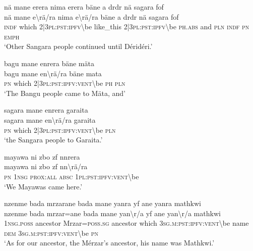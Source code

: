 \ea\label{ex:1:a3644}
nä mane erera nima erera bäne a drdr nä sagara fof\\
\gll nä	mane	e{\textbackslash}rä/ra	nima	e{\textbackslash}rä/ra	bäne	a	drdr	nä	sagara	fof\\
     \textsc{indf}	which	2|3\textsc{pl}:\textsc{pst}:\textsc{ipfv}{\textbackslash}be	like\_this	2|3\textsc{pl}:\textsc{pst}:\textsc{ipfv}{\textbackslash}be	\textsc{ph}.\textsc{abs}	and	\textsc{pln}	\textsc{indf}	\textsc{pn}	\textsc{emph}\\
\glt `Other Sangara people continued until Déridéri.'
\z

\ea\label{ex:1:a3647}
bagu mane enrera bäne mäta\\
\gll bagu	mane	en{\textbackslash}rä/ra	bäne	mata\\
     \textsc{pn}	which	2|3\textsc{pl}:\textsc{pst}:\textsc{ipfv}:\textsc{vent}{\textbackslash}be	\textsc{ph}	\textsc{pln}\\
\glt `The Bangu people came to Mäta, and'
\z

\ea\label{ex:1:a3649}
sagara mane enrera garaita\\
\gll sagara	mane	en{\textbackslash}rä/ra	garaita\\
     \textsc{pn}	which	2|3\textsc{pl}:\textsc{pst}:\textsc{ipfv}:\textsc{vent}{\textbackslash}be	\textsc{pln}\\
\glt `the Sangara people to Garaita.'
\z

\ea\label{ex:1:a3650}
mayawa ni zbo zf nnrera\\
\gll mayawa	ni	zbo	zf	nn{\textbackslash}rä/ra\\
     \textsc{pn}	1\textsc{nsg}	\textsc{prox}:\textsc{all}	\textsc{absc}	1\textsc{pl}:\textsc{pst}:\textsc{ipfv}:\textsc{vent}{\textbackslash}be\\
\glt `We Mayawas came here.'
\z

\ea\label{ex:1:a3652}
nzenme bada mrzarane bada mane yanra  yf ane yanra mathkwi\\
\gll nzenme	bada	mrzar=ane	bada	mane	yan{\textbackslash}r/a	yf	ane	yan{\textbackslash}r/a	mathkwi\\
     1\textsc{nsg}.\textsc{poss}	ancestor	Mrzar=\textsc{poss}.\textsc{sg}	ancestor	which	3\textsc{sg}.\textsc{m}:\textsc{pst}:\textsc{ipfv}:\textsc{vent}{\textbackslash}be	name	\textsc{dem}	3\textsc{sg}.\textsc{m}:\textsc{pst}:\textsc{ipfv}:\textsc{vent}{\textbackslash}be	\textsc{pn}\\
\glt `As for our ancestor, the Mérzar's ancestor, his name was Mathkwi.'
\z

